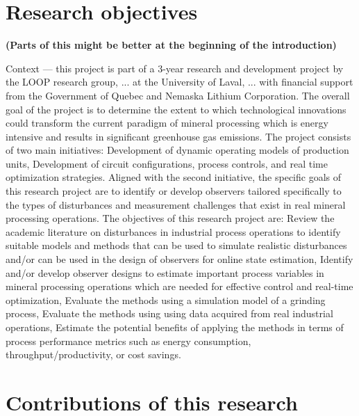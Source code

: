 \section*{Research objectives}

\textbf{(Parts of this might be better at the beginning of the introduction)}

\begin{outline}
	\1 Context — this project is part of a 3-year research and development project by the LOOP research group, ... at the University of Laval, ... with financial support from the Government of Quebec and Nemaska Lithium Corporation.
	\1 The overall goal of the project is to determine the extent to which technological innovations could transform the current paradigm of mineral processing which is energy intensive and results in significant greenhouse gas emissions.
	\1 The project consists of two main initiatives:
		\2 Development of dynamic operating models of production units,
		\2 Development of circuit configurations, process controls, and real time optimization strategies.
	\1 Aligned with the second initiative, the specific goals of this research project are to identify or develop observers tailored specifically to the types of disturbances and measurement challenges that exist in real mineral processing operations.
	\1 The objectives of this research project are:
		\2 Review the academic literature on disturbances in industrial process operations to identify suitable models and methods that can be used to simulate realistic disturbances and/or can be used in the design of observers for online state estimation,
		\2 Identify and/or develop observer designs to estimate important process variables in mineral processing operations which are needed for effective control and real-time optimization,
		\2 Evaluate the methods using a simulation model of a grinding process,
		\2 Evaluate the methods using using data acquired from real industrial operations,
		\2 Estimate the potential benefits of applying the methods in terms of process performance metrics such as energy consumption, throughput/productivity, or cost savings.
\end{outline}


\section*{Contributions of this research}

